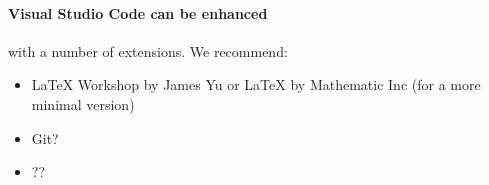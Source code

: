 \documentclass{ximera}
\begin{document}
\paragraph{Visual Studio Code can be enhanced} with a number of extensions. We
recommend:
\begin{itemize}
      \item LaTeX Workshop by James Yu or LaTeX by Mathematic Inc (for a more
            minimal version)
      \item Git?
      \item ??
\end{itemize}



\end{document}
